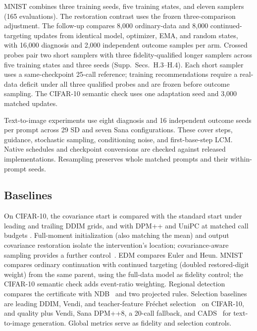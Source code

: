 MNIST combines three training seeds, five training states, and eleven
samplers (165 evaluations). The restoration contrast uses the frozen
three-comparison adjustment. The follow-up compares 8,000 ordinary-data
and 8,000 continued-targeting updates from identical model, optimizer,
EMA, and random states, with 16,000 diagnosis and 2,000 independent
outcome samples per arm. Crossed probes pair two short samplers with
three fidelity-qualified longer samplers across five training states
and three seeds (Supp.~Secs.~H.3--H.4). Each short sampler uses a
same-checkpoint 25-call reference; training recommendations require a
real-data deficit under all three qualified probes and are frozen before
outcome sampling. The CIFAR-10 semantic check uses one adaptation seed
and 3,000 matched updates.

Text-to-image experiments use eight diagnosis and 16 independent outcome
seeds per prompt across 29 SD and seven Sana configurations. These cover
steps, guidance, stochastic sampling, conditioning noise, and
first-base-step LCM. Native schedules and checkpoint conversions are
checked against released implementations. Resampling preserves whole
matched prompts and their within-prompt seeds.

\subsection{Baselines}
\label{sec:baselines}
On CIFAR-10, the covariance start is compared with the standard start
under leading and trailing DDIM grids, and with DPM++ and UniPC at
matched call budgets
\cite{song2021ddim,lu2022dpmpp,zhao2023unipc}. Full-moment initialization
(also matching the mean) and output covariance restoration isolate the
intervention's location; covariance-aware sampling provides a further
control~\cite{schioppa2026covariance}. EDM compares Euler and Heun.
MNIST compares ordinary continuation with continued targeting
(doubled restored-digit weight) from the same parent, using the full-data
model as fidelity control; the CIFAR-10 semantic check adds event-ratio
weighting. Regional detection compares the certificate with
NDB~\cite{richardson2018ndb} and two projected rules.
Selection baselines are leading DDIM, Vendi, and teacher-feature
Fr\'echet selection~\cite{heusel2017gans} on CIFAR-10, and quality plus
Vendi, Sana DPM++8, a 20-call fallback, and
CADS~\cite{sadat2024cads} for text-to-image generation.
Global metrics serve as fidelity and selection controls.

